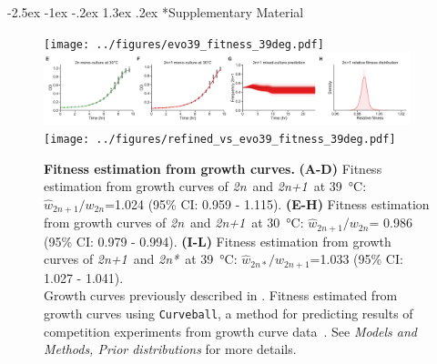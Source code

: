 \documentclass[12pt]{extarticle}
\makeatletter
\renewcommand\section{\@startsection {section}{1}{\z@}%
     {-2.5ex \@plus -1ex \@minus -.2ex}%
     {1.3ex \@plus.2ex}%
    {\Large\bfseries}}
\newcommand{\euwt}{\emph{2n}}
\newcommand{\anwt}{\emph{2n+1}}
\newcommand{\eumt}{\emph{2n*}}
\newcommand{\beginsupplement}{%
      	\setcounter{table}{0}
        \renewcommand{\thetable}{S\arabic{table}}%
        \setcounter{figure}{0}
        \renewcommand{\thefigure}{S\arabic{figure}}%
}
\makeatother
\begin{document}
\section*{Supplementary Material}
\beginsupplement %

\begin{figure}[h]
	\centering
	\texttt{[image: ../figures/evo39\_fitness\_39deg.pdf]} 
	\includegraphics[width=0.95\textwidth]{../figures/evo39_fitness_30deg.pdf} 
	\texttt{[image: ../figures/refined\_vs\_evo39\_fitness\_39deg.pdf]}
\caption{
    \textbf{Fitness estimation from growth curves.}
    \textbf{(A-D)} Fitness estimation from growth curves of \euwt\ and \anwt\ at \SI{39}{\celsius}: $\hat w_{2n+1}/w_{2n}$=1.024 (95\% CI: 0.959 - 1.115).
    \textbf{(E-H)} Fitness estimation from growth curves of \euwt\ and \anwt\ at \SI{30}{\celsius}: $\hat w_{2n+1}/w_{2n}$= 0.986 (95\% CI: 0.979 - 0.994).
    \textbf{(I-L)} Fitness estimation from growth curves of \anwt\ and \eumt\ at \SI{39}{\celsius}: $\hat w_{2n*}/w_{2n+1}$=1.033 (95\% CI: 1.027 - 1.041).\\
    Growth curves previously described in \citet[Figs. 3C, 4A, and S2]{Yona2012}.
	Fitness estimated from growth curves using \texttt{Curveball}, a method for predicting results of competition experiments from growth curve data~\citep[\href{https://curveball.yoavram.com}{curveball.yoavram.com}]{Ram2019}. See \emph{Models and Methods, Prior distributions} for more details.
} 
\label{fig:growth-curves}
\end{figure}
\end{document}
